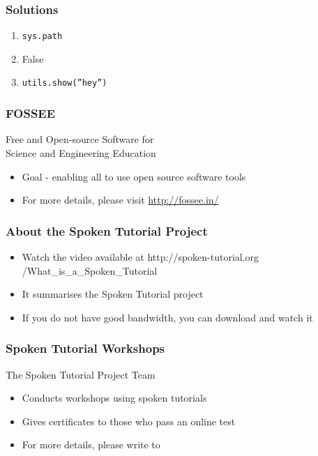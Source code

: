 \documentclass[17pt,compress]{beamer}
\begin{document}
\begin{frame}
\frametitle{Solutions}
\label{sec-9}

\begin{enumerate}
\item \texttt{sys.path}\pause
\vspace{12pt}
\item False\pause
\vspace{12pt}
\item \texttt{utils.show(''hey'')}
\end{enumerate}
\end{frame}
\begin{frame}
\frametitle{FOSSEE}
{\color{blue}Free and Open-source Software for \\Science and Engineering Education} \\
\begin{itemize}
\item Goal - enabling all to use open source software tools
\item For more details, please visit {\color{blue}\url{http://fossee.in/}}
\end{itemize}
\end{frame}
\begin{frame}
\frametitle{About the Spoken Tutorial Project}
\begin{itemize}
\item Watch the video available at {\color{blue}http://spoken-tutorial.org /What\_is\_a\_Spoken\_Tutorial}
\item It summarises the Spoken Tutorial project \pause
\item If you do not have good bandwidth, you can download and watch it
\end{itemize}
\end{frame}
\begin{frame}
\frametitle{Spoken Tutorial Workshops}The Spoken Tutorial Project Team 
\begin{itemize}
\item Conducts workshops using spoken tutorials 
\item Gives certificates to those who pass an online test 
\item For more details, please write to \\ 
\end{itemize}
\end{frame}
\end{document}
